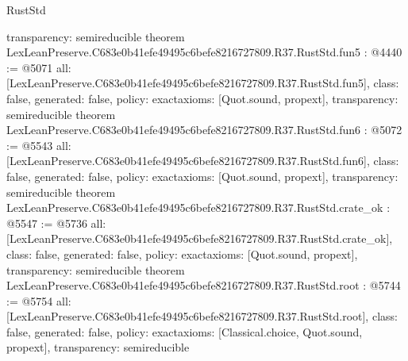 \begin{lexlean}{RustStd}
\begin{coremodule}
{  transparency: semireducible
}
theorem LexLeanPreserve.C683e0b41efe49495c6befe8216727809.R37.RustStd.fun5 : @4440 := @5071 {
  all: [LexLeanPreserve.C683e0b41efe49495c6befe8216727809.R37.RustStd.fun5],
  class: false,
  generated: false,
  policy: exact{axioms: [Quot.sound, propext]},
  transparency: semireducible
}
theorem LexLeanPreserve.C683e0b41efe49495c6befe8216727809.R37.RustStd.fun6 : @5072 := @5543 {
  all: [LexLeanPreserve.C683e0b41efe49495c6befe8216727809.R37.RustStd.fun6],
  class: false,
  generated: false,
  policy: exact{axioms: [Quot.sound, propext]},
  transparency: semireducible
}
theorem LexLeanPreserve.C683e0b41efe49495c6befe8216727809.R37.RustStd.crate_ok : @5547 := @5736 {
  all: [LexLeanPreserve.C683e0b41efe49495c6befe8216727809.R37.RustStd.crate_ok],
  class: false,
  generated: false,
  policy: exact{axioms: [Quot.sound, propext]},
  transparency: semireducible
}
theorem LexLeanPreserve.C683e0b41efe49495c6befe8216727809.R37.RustStd.root : @5744 := @5754 {
  all: [LexLeanPreserve.C683e0b41efe49495c6befe8216727809.R37.RustStd.root],
  class: false,
  generated: false,
  policy: exact{axioms: [Classical.choice, Quot.sound, propext]},
  transparency: semireducible
}


\end{coremodule}
\end{lexlean}
